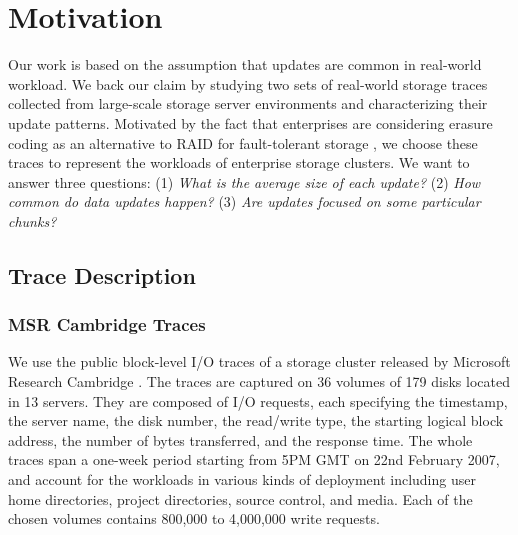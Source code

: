 \chapter{Motivation} 
\label{chap:motivation}
\label{sec:trace}

Our work is based on the assumption that updates are common in real-world workload. We
back our claim by studying two sets of real-world storage traces collected from
large-scale storage server environments and characterizing their update
patterns.  Motivated by the fact that enterprises are considering erasure coding
as an alternative to RAID for fault-tolerant storage \cite{raid_alternatives},
we choose these traces to represent the workloads of enterprise storage
clusters.  We want to answer three questions: (1) \textit{What is the average
    size of each update?} (2) \textit{How common do data updates happen?} (3)
\textit{Are updates focused on some particular chunks?}  


\section{Trace Description}

\subsection{MSR Cambridge Traces} 

We use the public block-level
I/O traces of a storage cluster released by Microsoft Research Cambridge
\cite{narayanan08}. The traces are captured %
on 36 volumes of 179 disks located in 13 servers.  They are composed
of I/O requests, each specifying the timestamp, the server name, the disk
number, the read/write type, the starting logical block address, 
the number of bytes transferred, and the response time.  The whole
traces span a one-week period starting from 5PM GMT on 22nd February 2007, and
account for the workloads in various kinds of deployment including user home
directories, project directories, source control, and media.  
Each of the chosen volumes contains 800,000 to 4,000,000 write requests. 


